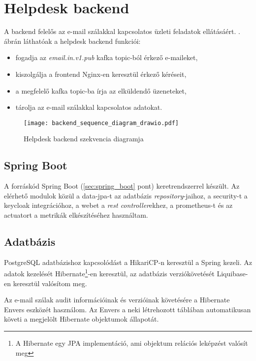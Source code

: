 \section{Helpdesk backend}\label{sec:backend}
A backend felelős az e-mail szálakkal kapcsolatos üzleti feladatok ellátásáért. . ábrán láthatóak a helpdesk backend funkciói:
\begin{itemize}
	\item fogadja az \textit{email.in.v1.pub} kafka topic-ból érkező e-maileket, 
	\item kiszolgálja a frontend Nginx-en keresztül érkező kéréseit,
	\item a megfelelő kafka topic-ba írja az elküldendő üzeneteket,
	\item tárolja az e-mail szálakkal kapcsolatos adatokat.
\end{itemize}


\begin{figure}[hbt] 
	\centering
	\texttt{[image: backend\_sequence\_diagram\_drawio.pdf]}
	\caption{Helpdesk backend szekvencia diagramja}
	\label{fig:backend_sequence_diagram}
\end{figure}


\subsection{Spring Boot}
A forráskód Spring Boot (\ref{sec:spring_boot} pont) keretrendszerrel készült. Az elérhető modulok közül a data-jpa-t az adatbázis \textit{repository}-jaihoz, a security-t a keycloak integrációhoz, a webet a \textit{rest controller}ekhez, a prometheus-t és az actuatort a metrikák elkészítéséhez használtam.	


\subsection{Adatbázis}\label{sec:adatbazis}
PostgreSQL adatbázishoz kapcsolódást a HikariCP-n keresztül a Spring kezeli.
Az adatok kezelését Hibernate\footnote{A Hibernate egy JPA implementáció, ami objektum relációs leképzést valósít meg}-en keresztül, az adatbázis verziókövetését Liquibase-en keresztül valósítom meg. 

Az e-mail szálak audit információinak és verzióinak követésére a Hibernate Envers eszközét használom. Az Envers a neki létrehozott táblában automatikusan követi a megjelölt Hibernate objektumok állapotát.

